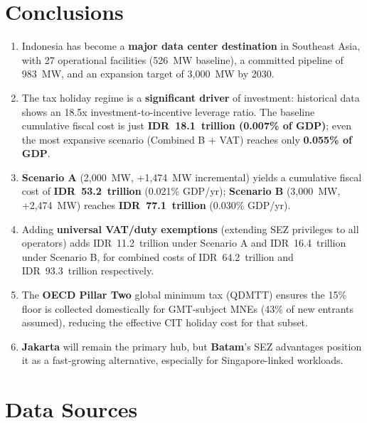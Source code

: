 \documentclass[11pt,a4paper]{article}
\begin{document}
\section{Conclusions}

\begin{enumerate}[leftmargin=*]
    \item Indonesia has become a \textbf{major data center destination} in Southeast Asia, with 27 operational facilities (526~MW baseline), a committed pipeline of 983~MW, and an expansion target of 3,000~MW by 2030.
    \item The tax holiday regime is a \textbf{significant driver} of investment: historical data shows an 18.5x investment-to-incentive leverage ratio. The baseline cumulative fiscal cost is just \textbf{IDR~18.1~trillion (0.007\% of GDP)}; even the most expansive scenario (Combined B + VAT) reaches only \textbf{0.055\% of GDP}.
    \item \textbf{Scenario A} (2,000~MW, +1,474~MW incremental) yields a cumulative fiscal cost of \textbf{IDR~53.2~trillion} (0.021\% GDP/yr); \textbf{Scenario B} (3,000~MW, +2,474~MW) reaches \textbf{IDR~77.1~trillion} (0.030\% GDP/yr).
    \item Adding \textbf{universal VAT/duty exemptions} (extending SEZ privileges to all operators) adds IDR~11.2~trillion under Scenario A and IDR~16.4~trillion under Scenario B, for combined costs of IDR~64.2~trillion and IDR~93.3~trillion respectively.
    \item The \textbf{OECD Pillar Two} global minimum tax (QDMTT) ensures the 15\% floor is collected domestically for GMT-subject MNEs (43\% of new entrants assumed), reducing the effective CIT holiday cost for that subset.
    \item \textbf{Jakarta} will remain the primary hub, but \textbf{Batam}'s SEZ advantages position it as a fast-growing alternative, especially for Singapore-linked workloads.
\end{enumerate}

\section*{Data Sources}
\end{document}
